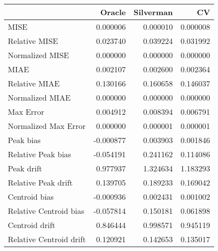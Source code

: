 \begin{tabular}{lrrr}
  \hline
 & Oracle & Silverman & CV \\ 
  \hline
MISE & 0.000006 & 0.000010 & 0.000008 \\ 
  Relative MISE & 0.023740 & 0.039224 & 0.031992 \\ 
  Normalized MISE & 0.000000 & 0.000000 & 0.000000 \\ 
  MIAE & 0.002107 & 0.002600 & 0.002364 \\ 
  Relative MIAE & 0.130166 & 0.160658 & 0.146037 \\ 
  Normalized MIAE & 0.000000 & 0.000000 & 0.000000 \\ 
  Max Error & 0.004912 & 0.008394 & 0.006791 \\ 
  Normalized Max Error & 0.000000 & 0.000001 & 0.000001 \\ 
  Peak bias & -0.000877 & 0.003903 & 0.001846 \\ 
  Relative Peak bias & -0.054191 & 0.241162 & 0.114086 \\ 
  Peak drift & 0.977937 & 1.324634 & 1.183293 \\ 
  Relative Peak drift & 0.139705 & 0.189233 & 0.169042 \\ 
  Centroid bias & -0.000936 & 0.002431 & 0.001002 \\ 
  Relative Centroid bias & -0.057814 & 0.150181 & 0.061898 \\ 
  Centroid drift & 0.846444 & 0.998571 & 0.945119 \\ 
  Relative Centroid drift & 0.120921 & 0.142653 & 0.135017 \\ 
   \hline
\end{tabular}

